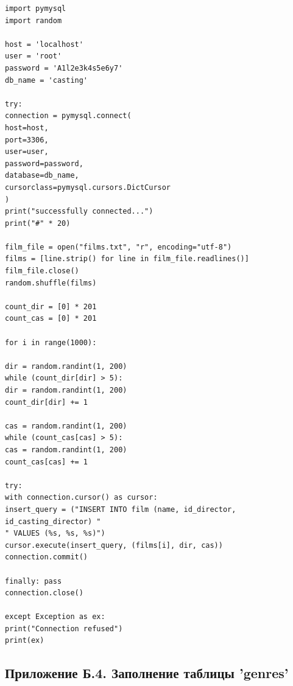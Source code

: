 \documentclass[11pt,a4paper,final]{article} %
\begin{document}
\begin{lstlisting}	
import pymysql
import random

host = 'localhost'
user = 'root'
password = 'A1l2e3k4s5e6y7'
db_name = 'casting'

try:
connection = pymysql.connect(
host=host,
port=3306,
user=user,
password=password,
database=db_name,
cursorclass=pymysql.cursors.DictCursor
)
print("successfully connected...")
print("#" * 20)

film_file = open("films.txt", "r", encoding="utf-8")
films = [line.strip() for line in film_file.readlines()]
film_file.close()
random.shuffle(films)

count_dir = [0] * 201
count_cas = [0] * 201

for i in range(1000):

dir = random.randint(1, 200)
while (count_dir[dir] > 5):
dir = random.randint(1, 200)
count_dir[dir] += 1

cas = random.randint(1, 200)
while (count_cas[cas] > 5):
cas = random.randint(1, 200)
count_cas[cas] += 1

try:
with connection.cursor() as cursor:
insert_query = ("INSERT INTO film (name, id_director, id_casting_director) "
" VALUES (%s, %s, %s)")
cursor.execute(insert_query, (films[i], dir, cas))
connection.commit()

finally: pass
connection.close()

except Exception as ex:
print("Connection refused")
print(ex)

\end{lstlisting}
	

\subsection*{Приложение Б.4. Заполнение таблицы 'genres'} 
\end{document}
